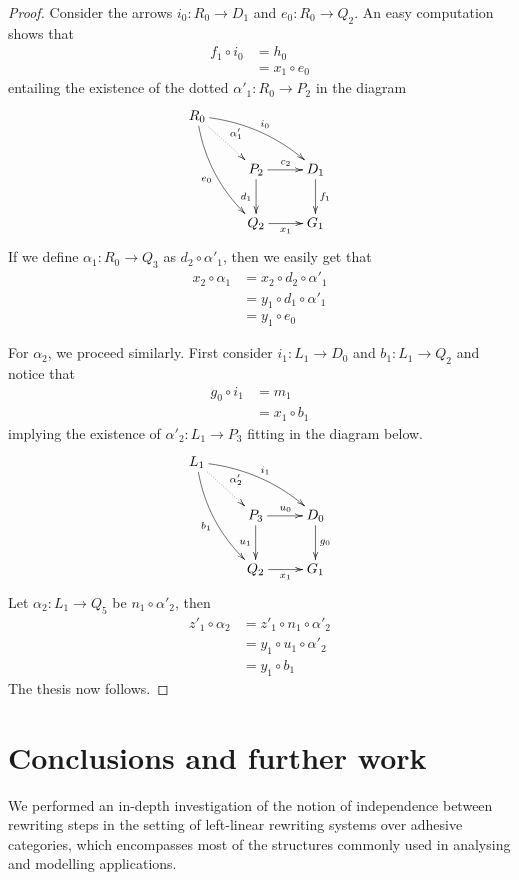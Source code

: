 \documentclass[a4paper,UKenglish,cleveref,pdftex,thm-restate,numberwithinsect,anonymous]{lipics}
\begin{document}
\begin{proof}
		Consider the arrows $i_0\colon R_0\to D_1$ and $e_0\colon R_0\to Q_2$. An easy computation shows that
		\begin{align*}
			f_1\circ i_0 & = h_0 \\&=x_1\circ e_0
		\end{align*}
		entailing the existence of  the dotted $\alpha'_1\colon R_0\to P_2$ in the diagram
		\[\xymatrix{R_0 \ar@{.>}[dr]^{\alpha'_1} \ar@/^.3cm/[drr]^{i_0} \ar@/_.3cm/[ddr]_{e_0}\\ &P_2 \ar[r]^{c_2} \ar[d]_{d_1}& D_1 \ar[d]^{f_1}\\ &Q_2\ar[r]_{x_1} & G_1}\]
		If we define $\alpha_1\colon R_0\to Q_3$ as $d_2\circ \alpha'_1$, then we easily get that
		\begin{align*}
			x_2\circ \alpha_1 & =x_2\circ d_2\circ \alpha'_1 \\&= y_1\circ d_1\circ \alpha'_1\\&=y_1\circ e_0
		\end{align*}

		For $\alpha_2$, we proceed similarly. First consider  $i_1\colon L_1\to D_0$ and $b_1\colon L_1 \to Q_2$ and notice that
		\begin{align*}
			g_0\circ i_1 & = m_1 \\&= x_1 \circ b_1
		\end{align*}
		implying the existence of $\alpha'_2\colon L_1\to P_3$ fitting in the diagram below.
		\[\xymatrix{L_1 \ar@{.>}[dr]^{\alpha'_2} \ar@/^.3cm/[drr]^{i_1} \ar@/_.3cm/[ddr]_{b_1}\\ &P_3 \ar[r]^{u_0} \ar[d]_{u_1}& D_0 \ar[d]^{g_0}\\ &Q_2\ar[r]_{x_1} & G_1}\]
		Let $\alpha_2\colon L_1\to Q_5$ be $n_1\circ \alpha'_2$, then
		\begin{align*}
			z'_1 \circ \alpha_2 & = z'_1 \circ n_1\circ \alpha'_2 \\&=y_1\circ u_1\circ \alpha'_2\\&=y_1\circ b_1
		\end{align*}
		The thesis now follows.
	\end{proof}
\fi





\section{Conclusions and further work}
\label{conclusions}

We performed an in-depth investigation of the notion of independence between
rewriting steps in the setting of left-linear rewriting systems
over adhesive categories, which encompasses most of the
structures commonly used in analysing and modelling applications.
\end{document}
